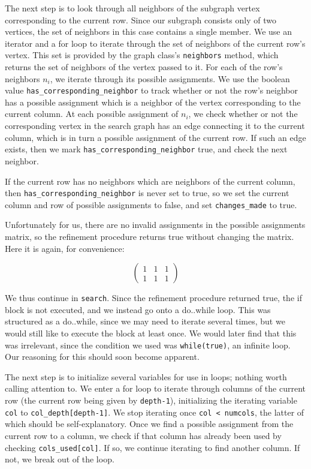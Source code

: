 \documentclass{article}
\begin{document}
  The next step is to look through all neighbors of the subgraph vertex corresponding to the current row. Since our subgraph consists only of two vertices, the set of neighbors in this case contains a single member. We use an iterator and a for loop to iterate through the set of neighbors of the current row's vertex. This set is provided by the graph class's \texttt{neighbors} method, which returns the set of neighbors of the vertex passed to it. For each of the row's neighbors $n_i$, we iterate through its possible assignments. We use the boolean value \texttt{has\_corresponding\_neighbor} to track whether or not the row's neighbor has a possible assignment which is a neighbor of the vertex corresponding to the current column. At each possible assignment of $n_i$, we check whether or not the corresponding vertex in the search graph has an edge connecting it to the current column, which is in turn a possible assignment of the current row. If such an edge exists, then we mark \texttt{has\_corresponding\_neighbor} true, and check the next neighbor.

  If the current row has no neighbors which are neighbors of the current column, then \texttt{has\_corresponding\_neighbor} is never set to true, so we set the current column and row of possible assignments to false, and set \texttt{changes\_made} to true.

  Unfortunately for us, there are no invalid assignments in the possible assignments matrix, so the refinement procedure returns true without changing the matrix. Here it is again, for convenience:

  \[ \begin{pmatrix}
      1 & 1 & 1 \\
      1 & 1 & 1
  \end{pmatrix} \]

  We thus continue in \texttt{search}. Since the refinement procedure returned true, the if block is not executed, and we instead go onto a do..while loop. This was structured as a do..while, since we may need to iterate several times, but we would still like to execute the block at least once. We would later find that this was irrelevant, since the condition we used was \texttt{while(true)}, an infinite loop. Our reasoning for this should soon become apparent. 
  
  The next step is to initialize several variables for use in loops; nothing worth calling attention to. We enter a for loop to iterate through columns of the current row (the current row being given by \texttt{depth-1}), initializing the iterating variable \texttt{col} to \texttt{col\_depth[depth-1]}. We stop iterating once \texttt{col < numcols}, the latter of which should be self-explanatory. Once we find a possible assignment from the current row to a column, we check if that column has already been used by checking \texttt{cols\_used[col]}. If so, we continue iterating to find another column. If not, we break out of the loop.
\end{document}
